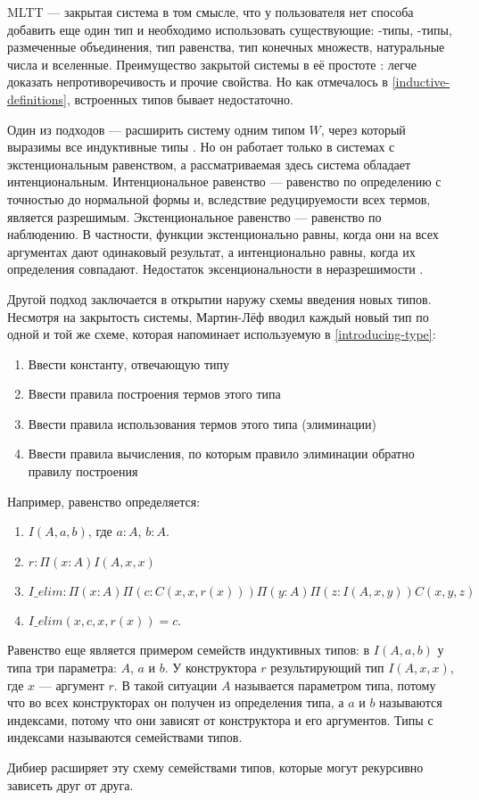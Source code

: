 MLTT --- закрытая система в том смысле, что у пользователя нет способа добавить
еще один тип и необходимо использовать существующие: \textPi-типы,
\textSigma-типы, размеченные объединения, тип равенства, тип конечных множеств,
натуральные числа и вселенные. Преимущество закрытой системы в её простоте
\cite{observational-equality-now}: легче доказать непротиворечивость и прочие свойства.
Но как отмечалось в \ref{inductive-definitions}, встроенных типов бывает недостаточно.

Один из подходов --- расширить систему одним типом \(W\), через который выразимы
все индуктивные типы \cite{inductive-families}. Но он работает только в системах
с экстенциональным равенством, а рассматриваемая здесь система обладает интенциональным.
Интенциональное равенство --- равенство по определению с точностью до нормальной
формы и, вследствие редуцируемости всех термов, является разрешимым. Экстенциональное
равенство --- равенство по наблюдению. В частности, функции экстенционально равны,
когда они на всех аргументах дают одинаковый результат, а интенционально равны,
когда их определения совпадают. Недостаток эксенциональности в неразрешимости
\cite{observational-equality-now}.

Другой подход заключается в открытии наружу схемы введения новых типов.
Несмотря на закрытость системы, Мартин-Лёф вводил каждый новый тип по одной
и той же схеме, которая напоминает используемую в \ref{introducing-type}:
\begin{enumerate}
\item Ввести константу, отвечающую типу
\item Ввести правила построения термов этого типа
\item Ввести правила использования термов этого типа (элиминации)
\item Ввести правила вычисления, по которым правило элиминации обратно
  правилу построения
\end{enumerate}

Например, равенство определяется:
\begin{enumerate}
\item \(I(A, a, b)\), где \(a : A\), \(b : A\).
\item \(r : \Pi(x : A)I(A, x, x)\)
\item \(I\_elim : \Pi(x : A) \Pi(c : C(x, x, r(x))) \Pi(y : A) \Pi(z : I(A, x, y)) C(x, y, z)\)
\item \(I\_elim(x, c, x, r(x)) = c\).
\end{enumerate}

Равенство еще является примером семейств индуктивных типов: в \(I(A, a, b)\)
у типа три параметра: \(A\), \(a\) и \(b\). У конструктора \(r\) результирующий
тип \(I(A, x, x)\), где \(x\) --- аргумент \(r\). В такой ситуации \(A\) называется
параметром типа, потому что во всех конструкторах он получен из определения
типа, а \(a\) и \(b\) называются индексами, потому что они зависят от конструктора
и его аргументов. Типы с индексами называются семействами типов.

Дибиер \cite{inductive-families} расширяет эту схему семействами типов,
которые могут рекурсивно зависеть друг от друга.
